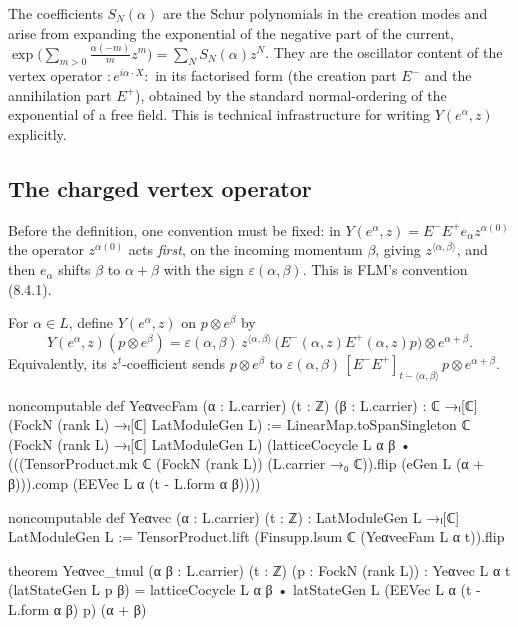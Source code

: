 \begin{physics}
The coefficients $S_N(\alpha)$ are the Schur polynomials in the creation modes and arise from expanding the exponential of the negative part of the current, $\exp\bigl(\sum_{m>0}\frac{\alpha(-m)}{m}z^m\bigr)=\sum_NS_N(\alpha)z^N$. They are the oscillator content of the vertex operator $:\!e^{i\alpha\cdot X}\!:$ in its factorised form (the creation part $E^-$ and the annihilation part $E^+$), obtained by the standard normal-ordering of the exponential of a free field. This is technical infrastructure for writing $Y(e^\alpha,z)$ explicitly.
\end{physics}

\subsection{The charged vertex operator}

Before the definition, one convention must be fixed: in $Y(e^\alpha,z)=E^-E^+e_\alpha
z^{\alpha(0)}$ the operator $z^{\alpha(0)}$ acts \emph{first}, on the incoming momentum $\beta$,
giving $z^{\langle\alpha,\beta\rangle}$, and then $e_\alpha$ shifts $\beta$ to $\alpha+\beta$ with
the sign $\varepsilon(\alpha,\beta)$. This is FLM's convention (8.4.1).

\begin{definition}[$Y(e^\alpha,z)$]\label{ch03:def:Yealpha}
For $\alpha\in L$, define $Y(e^\alpha,z)$ on $p\otimes e^\beta$ by
\begin{equation}\label{ch03:eq:Yealpha}
  Y(e^\alpha,z)(p\otimes e^\beta)=\varepsilon(\alpha,\beta)\,z^{\langle\alpha,\beta\rangle}\,
  \bigl(E^-(\alpha,z)E^+(\alpha,z)p\bigr)\otimes e^{\alpha+\beta}.
\end{equation}
Equivalently, its $z^t$-coefficient sends $p\otimes e^\beta$ to
$\varepsilon(\alpha,\beta)\,[E^-E^+]_{t-\langle\alpha,\beta\rangle}\,p\otimes e^{\alpha+\beta}$.
\end{definition}
\begin{leancode}
noncomputable def YeαvecFam (α : L.carrier) (t : ℤ) (β : L.carrier) :
    ℂ →ₗ[ℂ] (FockN (rank L) →ₗ[ℂ] LatModuleGen L) :=
  LinearMap.toSpanSingleton ℂ (FockN (rank L) →ₗ[ℂ] LatModuleGen L)
    (latticeCocycle L α β •
      (((TensorProduct.mk ℂ (FockN (rank L)) (L.carrier →₀ ℂ)).flip (eGen L (α + β))).comp
        (EEVec L α (t - L.form α β))))

noncomputable def Yeαvec (α : L.carrier) (t : ℤ) : LatModuleGen L →ₗ[ℂ] LatModuleGen L :=
  TensorProduct.lift (Finsupp.lsum ℂ (YeαvecFam L α t)).flip

theorem Yeαvec_tmul (α β : L.carrier) (t : ℤ) (p : FockN (rank L)) :
    Yeαvec L α t (latStateGen L p β)
      = latticeCocycle L α β • latStateGen L (EEVec L α (t - L.form α β) p) (α + β)
\end{leancode}

